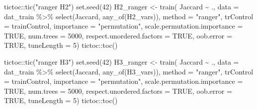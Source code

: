 \documentclass[
  letterpaper,
  DIV=11,
  numbers=noendperiod]{scrreprt}
\newenvironment{Shaded}{\begin{snugshade}}{\end{snugshade}}
\newcommand{\AttributeTok}[1]{\textcolor[rgb]{0.40,0.45,0.13}{#1}}
\newcommand{\ConstantTok}[1]{\textcolor[rgb]{0.56,0.35,0.01}{#1}}
\newcommand{\DecValTok}[1]{\textcolor[rgb]{0.68,0.00,0.00}{#1}}
\newcommand{\FunctionTok}[1]{\textcolor[rgb]{0.28,0.35,0.67}{#1}}
\newcommand{\NormalTok}[1]{\textcolor[rgb]{0.00,0.23,0.31}{#1}}
\newcommand{\OtherTok}[1]{\textcolor[rgb]{0.00,0.23,0.31}{#1}}
\newcommand{\SpecialCharTok}[1]{\textcolor[rgb]{0.37,0.37,0.37}{#1}}
\newcommand{\StringTok}[1]{\textcolor[rgb]{0.13,0.47,0.30}{#1}}
\begin{document}
\begin{Shaded}
\begin{Highlighting}[]
\NormalTok{tictoc}\SpecialCharTok{::}\FunctionTok{tic}\NormalTok{(}\StringTok{"ranger H2"}\NormalTok{)}
\FunctionTok{set.seed}\NormalTok{(}\DecValTok{42}\NormalTok{)}
\NormalTok{H2\_ranger }\OtherTok{\textless{}{-}} \FunctionTok{train}\NormalTok{(}
\NormalTok{    Jaccard }\SpecialCharTok{\textasciitilde{}}\NormalTok{ .,}
    \AttributeTok{data =}\NormalTok{ dat\_train }\SpecialCharTok{\%\textgreater{}\%} \FunctionTok{select}\NormalTok{(Jaccard, }\FunctionTok{any\_of}\NormalTok{(H2\_vars)),}
    \AttributeTok{method =} \StringTok{"ranger"}\NormalTok{,}
    \AttributeTok{trControl =}\NormalTok{ trainControl,}
    \AttributeTok{importance =} \StringTok{"permutation"}\NormalTok{,}
    \AttributeTok{scale.permutation.importance =} \ConstantTok{TRUE}\NormalTok{,}
    \AttributeTok{num.trees =} \DecValTok{5000}\NormalTok{,}
    \AttributeTok{respect.unordered.factors =} \ConstantTok{TRUE}\NormalTok{,}
    \AttributeTok{oob.error =} \ConstantTok{TRUE}\NormalTok{,}
    \AttributeTok{tuneLength =} \DecValTok{5}\NormalTok{)}
\NormalTok{tictoc}\SpecialCharTok{::}\FunctionTok{toc}\NormalTok{()}


\NormalTok{tictoc}\SpecialCharTok{::}\FunctionTok{tic}\NormalTok{(}\StringTok{"ranger H3"}\NormalTok{)}
\FunctionTok{set.seed}\NormalTok{(}\DecValTok{42}\NormalTok{)}
\NormalTok{H3\_ranger }\OtherTok{\textless{}{-}} \FunctionTok{train}\NormalTok{(}
\NormalTok{    Jaccard }\SpecialCharTok{\textasciitilde{}}\NormalTok{ .,}
    \AttributeTok{data =}\NormalTok{ dat\_train }\SpecialCharTok{\%\textgreater{}\%} \FunctionTok{select}\NormalTok{(Jaccard, }\FunctionTok{any\_of}\NormalTok{(H3\_vars)),}
    \AttributeTok{method =} \StringTok{"ranger"}\NormalTok{,}
    \AttributeTok{trControl =}\NormalTok{ trainControl,}
    \AttributeTok{importance =} \StringTok{"permutation"}\NormalTok{,}
    \AttributeTok{scale.permutation.importance =} \ConstantTok{TRUE}\NormalTok{,}
    \AttributeTok{num.trees =} \DecValTok{5000}\NormalTok{,}
    \AttributeTok{respect.unordered.factors =} \ConstantTok{TRUE}\NormalTok{,}
    \AttributeTok{oob.error =} \ConstantTok{TRUE}\NormalTok{,}
    \AttributeTok{tuneLength =} \DecValTok{5}\NormalTok{)}
\NormalTok{tictoc}\SpecialCharTok{::}\FunctionTok{toc}\NormalTok{()}


\end{Highlighting}
\end{Shaded}
\end{document}
